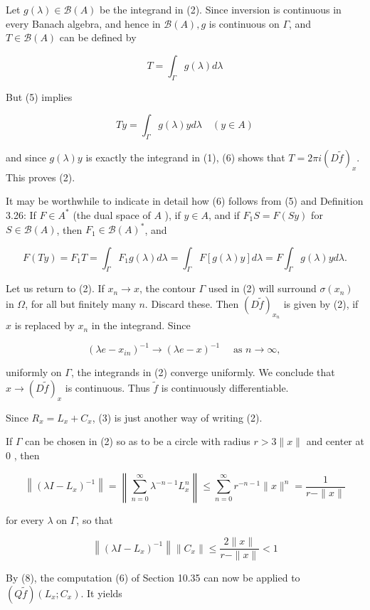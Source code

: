\documentclass[10pt]{article}
\begin{document}
Let $g(\lambda) \in \mathscr{B}(A)$ be the integrand in (2). Since inversion is continuous in every Banach algebra, and hence in $\mathscr{B}(A), g$ is continuous on $\Gamma$, and $T \in \mathscr{B}(A)$ can be defined by

$$
T=\int_{\Gamma} g(\lambda) d \lambda
$$

But (5) implies

$$
T y=\int_{\Gamma} g(\lambda) y d \lambda \quad(y \in A)
$$

and since $g(\lambda) y$ is exactly the integrand in (1), (6) shows that $T=2 \pi i(D \tilde{f})_{x}$. This proves (2).

It may be worthwhile to indicate in detail how (6) follows from (5) and Definition 3.26: If $F \in A^{*}$ (the dual space of $A$ ), if $y \in A$, and if $F_{1} S=F(S y)$ for $S \in \mathscr{B}(A)$, then $F_{1} \in \mathscr{B}(A)^{*}$, and

$$
F(T y)=F_{1} T=\int_{\Gamma} F_{1} g(\lambda) d \lambda=\int_{\Gamma} F[g(\lambda) y] d \lambda=F \int_{\Gamma} g(\lambda) y d \lambda .
$$

Let us return to (2). If $x_{n} \rightarrow x$, the contour $\Gamma$ used in (2) will surround $\sigma\left(x_{n}\right)$ in $\Omega$, for all but finitely many $n$. Discard these. Then $(D \tilde{f})_{x_{n}}$ is given by (2), if $x$ is replaced by $x_{n}$ in the integrand. Since

$$
\left(\lambda e-x_{i n}\right)^{-1} \rightarrow(\lambda e-x)^{-1} \quad \text { as } n \rightarrow \infty \text {, }
$$

uniformly on $\Gamma$, the integrands in (2) converge uniformly. We conclude that $x \rightarrow(D \tilde{f})_{x}$ is continuous. Thus $\tilde{f}$ is continuously differentiable.

Since $R_{x}=L_{x}+C_{x}$, (3) is just another way of writing (2).

If $\Gamma$ can be chosen in (2) so as to be a circle with radius $r>3\|x\|$ and center at 0 , then

$$
\left\|\left(\lambda I-L_{x}\right)^{-1}\right\|=\left\|\sum_{n=0}^{\infty} \lambda^{-n-1} L_{x}^{n}\right\| \leq \sum_{n=0}^{\infty} r^{-n-1}\|x\|^{n}=\frac{1}{r-\|x\|}
$$

for every $\lambda$ on $\Gamma$, so that

$$
\left\|\left(\lambda I-L_{x}\right)^{-1}\right\|\left\|C_{x}\right\| \leq \frac{2\|x\|}{r-\|x\|}<1
$$

By (8), the computation (6) of Section 10.35 can now be applied to $(Q \tilde{f})\left(L_{x} ; C_{x}\right)$. It yields
\end{document}
